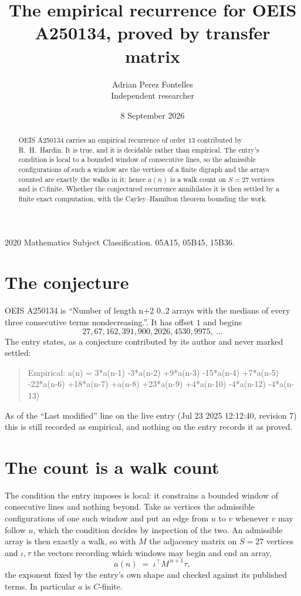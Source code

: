 \documentclass[11pt,a4paper]{article}
\title{The empirical recurrence for OEIS A250134, proved by transfer matrix}
\author{Adrian Perez Fontelles\\ \small Independent researcher}
\date{8 September 2026}
\theoremstyle{plain}
\theoremstyle{definition}
\begin{document}
\maketitle

\begin{abstract}
OEIS A250134 carries an empirical recurrence of order $13$ contributed by R.~H.~Hardin. It is
true, and it is decidable rather than empirical. The entry's condition is local to a bounded window of consecutive lines, so
the admissible configurations of such a window are the vertices of a finite digraph and the
arrays counted are exactly the walks in it; hence $a(n)$ is a walk count on $S=27$ vertices
and is $C$-finite. Whether the conjectured recurrence annihilates it is then settled by a
finite exact computation, with the Cayley--Hamilton theorem bounding the work.
\end{abstract}

\noindent\small 2020 Mathematics Subject Classification. 05A15, 05B45, 15B36.\normalsize

\section{The conjecture}

OEIS A250134 is ``Number of length n+2 0..2 arrays with the medians of every three consecutive terms nondecreasing.''. It has offset $1$ and begins
\[
27, 67, 162, 391, 900, 2026, 4530, 9975,\ \dots
\]
The entry states, as a conjecture contributed by its author and never marked settled:
\begin{quote}
Empirical: a(n) = 3*a(n-1) -3*a(n-2) +9*a(n-3) -15*a(n-4) +7*a(n-5) -22*a(n-6) +18*a(n-7) +a(n-8) +23*a(n-9) +4*a(n-10) -4*a(n-12) -4*a(n-13)
\end{quote}
As of the ``Last modified'' line on the live entry (Jul 23 2025 12:12:40, revision 7) this is still
recorded as empirical, and nothing on the entry records it as proved.

\section{The count is a walk count}

The condition the entry imposes is local: it constrains a bounded window of consecutive lines and nothing beyond. Take as
vertices the admissible configurations of one such window and put an edge from $u$ to $v$
whenever $v$ may follow $u$, which the condition decides by inspection of the two. An
admissible array is then exactly a walk, so with $M$ the adjacency matrix on $S=27$ vertices
and $\iota,\tau$ the vectors recording which windows may begin and end an array,
\[
a(n)\;=\;\iota^{\!\top}M^{\,n+1}\tau ,
\]
the exponent fixed by the entry's own shape and checked against its published terms. In
particular $a$ is $C$-finite.
\end{document}
